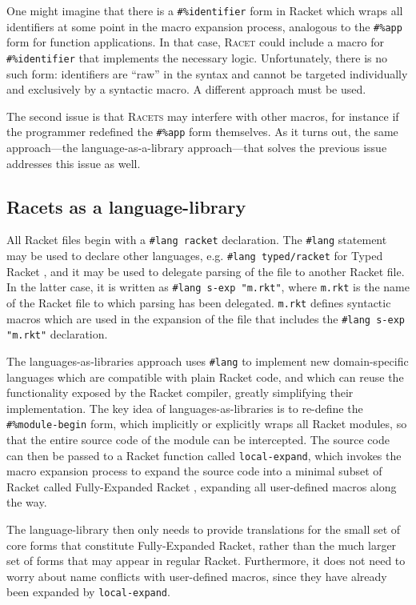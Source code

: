 \documentclass{article}
\begin{document}
One might imagine that there is a \texttt{\#\%identifier} form in Racket which wraps all identifiers at some point in the macro expansion process, analogous to the \texttt{\#\%app} form for function applications. In that case, \textsc{Racet} could include a macro for \texttt{\#\%identifier} that implements the necessary logic. Unfortunately, there is no such form: identifiers are ``raw'' in the syntax and cannot be targeted individually and exclusively by a syntactic macro. A different approach must be used.

The second issue is that \textsc{Racets} may interfere with other macros, for instance if the programmer redefined the \texttt{\#\%app} form themselves. As it turns out, the same approach---the language-as-a-library approach---that solves the previous issue addresses this issue as well.


\subsection{Racets as a language-library}
All Racket files begin with a \texttt{\#lang racket} declaration. The \texttt{\#lang} statement may be used to declare other languages, e.g. \texttt{\#lang typed/racket} for Typed Racket \cite{typed-racket}, and it may be used to delegate parsing of the file to another Racket file. In the latter case, it is written as \texttt{\#lang s-exp "m.rkt"}, where \texttt{m.rkt} is the name of the Racket file to which parsing has been delegated. \texttt{m.rkt} defines syntactic macros which are used in the expansion of the file that includes the \texttt{\#lang s-exp "m.rkt"} declaration.

The languages-as-libraries approach \cite{lang-as-lib} uses \texttt{\#lang} to implement new domain-specific languages which are compatible with plain Racket code, and which can reuse the functionality exposed by the Racket compiler, greatly simplifying their implementation. The key idea of languages-as-libraries is to re-define the \texttt{\#\%module-begin} form, which implicitly or explicitly wraps all Racket modules, so that the entire source code of the module can be intercepted. The source code can then be passed to a Racket function called \texttt{local-expand}, which invokes the macro expansion process to expand the source code into a minimal subset of Racket called Fully-Expanded Racket \cite{fe-racket}, expanding all user-defined macros along the way.

The language-library then only needs to provide translations for the small set of core forms that constitute Fully-Expanded Racket, rather than the much larger set of forms that may appear in regular Racket. Furthermore, it does not need to worry about name conflicts with user-defined macros, since they have already been expanded by \texttt{local-expand}.
\end{document}
